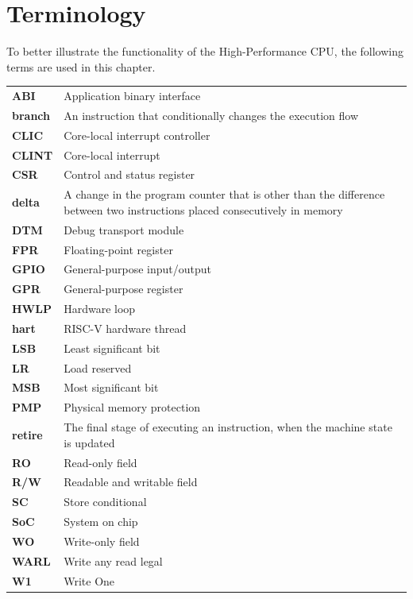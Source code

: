 \documentclass[main\_\_EN.tex]{subfiles}
\begin{document}
\section{Terminology}

To better illustrate the functionality of the High-Performance CPU, the following terms are used in this chapter.

\begin{longtable}[c]{ R{2cm} p{12cm} }
\textbf{ABI} & Application binary interface\\
\textbf{branch} & An instruction that conditionally changes the execution flow \\
\textbf{CLIC} & Core-local interrupt controller\\
\textbf{CLINT} & Core-local interrupt\\
\textbf{CSR} & Control and status register\\
\textbf{delta} & A change in the program counter that is other than the difference between two instructions placed consecutively in memory \\
\textbf{DTM} & Debug transport module \\
\textbf{FPR} & Floating-point register\\
\textbf{GPIO} & General-purpose input/output\\
\textbf{GPR} & General-purpose register\\
\textbf{HWLP} & Hardware loop\\
\textbf{hart} & RISC-V hardware thread \\
\textbf{LSB} & Least significant bit\\
\textbf{LR} & Load reserved\\
\textbf{MSB} & Most significant bit\\
\textbf{PMP} & Physical memory protection\\
\textbf{retire} & The final stage of executing an instruction, when the machine state is updated \\
\textbf{RO} & Read-only field\\
\textbf{R/W} & Readable and writable field\\
\textbf{SC} & Store conditional\\
\textbf{SoC} & System on chip\\
\textbf{WO} & Write-only field\\
\textbf{WARL} & Write any read legal\\
\textbf{W1} & Write One\\
\end{longtable}
\end{document}
